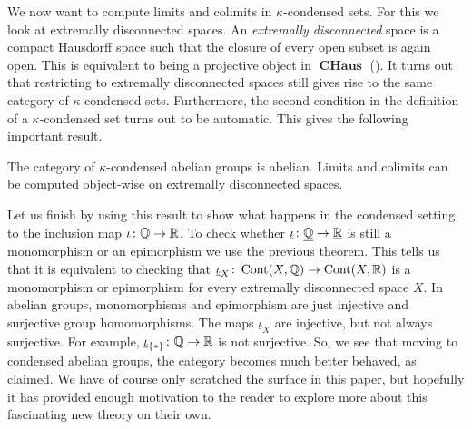 \documentclass{article}
\DeclareMathOperator{\Cont}{Cont}
\DeclareMathOperator{\CHaus}{\mathbf{CHaus}}
\begin{document}
We now want to compute limits and colimits
in $\kappa$-condensed sets. For this we look
at extremally disconnected spaces.
An \emph{extremally disconnected} space is a compact Hausdorff
space such that the closure of every open subset is again open.
This is equivalent to being a projective object in $\CHaus$ (\cite[Theorem 2.5]{Gle1958ProjectiveTS}).
It turns out that restricting to extremally disconnected spaces still gives
rise to the same category of $\kappa$-condensed sets. Furthermore,
the second condition in the definition of a $\kappa$-condensed set
turns out to be automatic. This gives the following important result.
\begin{theorem}
    The category of $\kappa$-condensed abelian groups is abelian.
    Limits and colimits can be computed object-wise on extremally
    disconnected spaces.
\end{theorem}
Let us finish by using this result to show what happens
in the condensed setting to the inclusion map $\iota \colon \mathbb{Q} \to \mathbb{R}$.
To check whether $\underline{\iota} \colon \underline{\mathbb{Q}} \to \underline{\mathbb{R}}$
is still a monomorphism or an epimorphism we use the previous theorem.
This tells us that it is equivalent to checking that
$\underline{\iota}_X \colon \Cont(X, \bbQ) \to \Cont(X, \bbR)$
is a monomorphism or epimorphism for every extremally disconnected space $X$.
In abelian groups, monomorphisms and epimorphism are just injective and surjective group
homomorphisms. The maps $\underline{\iota}_X$ are injective, but not always surjective.
For example, $\underline{\iota}_{\{*\}} \colon \mathbb{Q} \to \mathbb{R}$ is not surjective.
So, we see that moving to condensed abelian groups, the category becomes much
better behaved, as claimed.
We have of course only scratched the surface in this paper, but
hopefully it has provided enough motivation to the reader to explore more about this fascinating
new theory on their own.



\end{document}
